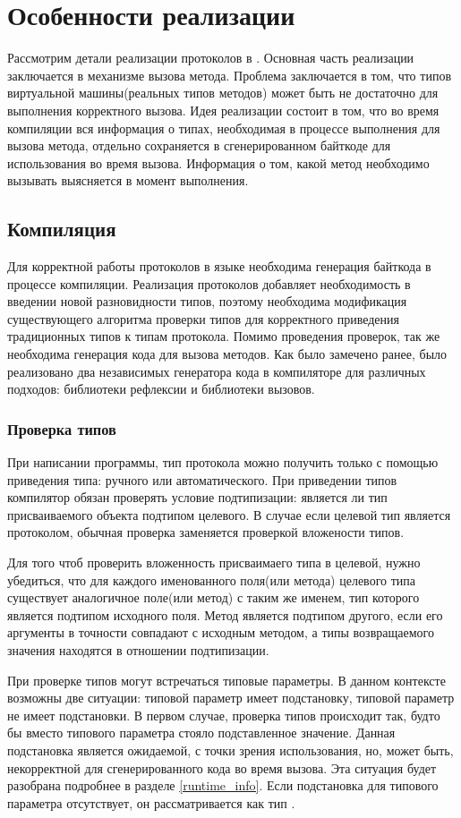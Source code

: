 \section{Особенности реализации}
Рассмотрим детали реализации протоколов в . Основная часть реализации заключается в механизме вызова метода. Проблема заключается в том, что типов виртуальной машины(реальных типов методов) может быть не достаточно для выполнения корректного вызова. Идея реализации состоит в том, что во время компиляции вся информация о типах, необходимая в процессе выполнения для вызова метода, отдельно сохраняется в сгенерированном байткоде для использования во время вызова. Информация о том, какой метод необходимо вызывать выясняется в момент выполнения.

\subsection{Компиляция}
Для корректной работы протоколов в языке необходима генерация байткода в процессе компиляции. Реализация протоколов добавляет необходимость в введении новой разновидности типов, поэтому необходима модификация существующего алгоритма проверки типов для корректного приведения традиционных типов к типам протокола. Помимо проведения проверок, так же необходима генерация кода для вызова методов. Как было замечено ранее, было реализовано два независимых генератора кода в компиляторе для различных подходов: библиотеки рефлексии и библиотеки вызовов.

\subsubsection{Проверка типов}
При написании программы, тип протокола можно получить только с помощью приведения типа: ручного или автоматического. При приведении типов компилятор обязан проверять условие подтипизации: является ли тип присваиваемого объекта подтипом целевого. В случае если целевой тип является протоколом, обычная проверка заменяется проверкой вложености типов.

Для того чтоб проверить вложенность присваимаего типа в целевой, нужно убедиться, что для каждого именованного поля(или метода) целевого типа существует аналогичное поле(или метод) с таким же именем, тип которого является подтипом исходного поля. Метод является подтипом другого, если его аргументы в точности совпадают с исходным методом, а типы возвращаемого значения находятся в отношении подтипизации.

При проверке типов могут встречаться типовые параметры. В данном контексте возможны две ситуации: типовой параметр имеет подстановку, типовой параметр не имеет подстановки. В первом случае, проверка типов происходит так, будто бы вместо типового параметра стояло подставленное значение. Данная подстановка является ожидаемой, с точки зрения использования, но, может быть, некорректной для сгенерированного кода во время вызова. Эта ситуация будет разобрана подробнее в разделе \ref{runtime_info}. Если подстановка для типового параметра отсутствует, он рассматривается как тип .

